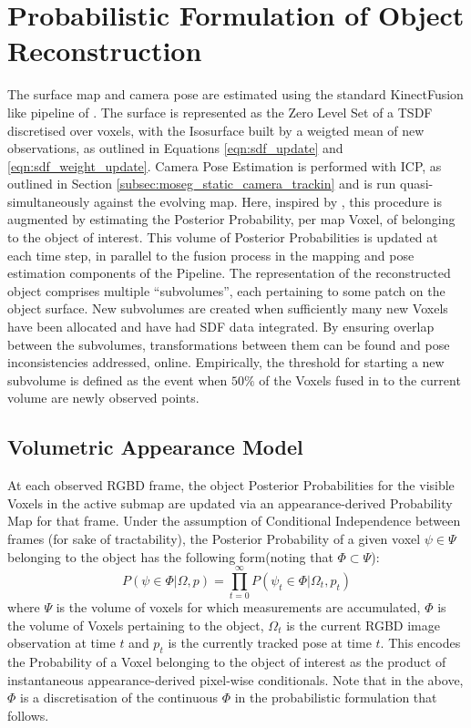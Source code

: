 \section{Probabilistic Formulation of Object Reconstruction}
\label{sec:probobj_prob_formulation}
The surface map and camera pose are estimated using the standard KinectFusion
like pipeline of \cite{Newcombe2011,Prisacariu2014}. The surface is represented
as the Zero Level Set of a TSDF discretised over voxels, with the Isosurface
built by a weigted mean of new observations, as outlined in Equations
\ref{eqn:sdf_update} and \ref{eqn:sdf_weight_update}. Camera Pose Estimation is
performed with ICP, as outlined in Section
\ref{subsec:moseg_static_camera_trackin} and is run quasi-simultaneously against
the evolving map. Here, inspired by \cite{Kolev2006}, this procedure is
augmented by estimating the Posterior Probability, per map Voxel, of belonging
to the object of interest. This volume of Posterior Probabilities is updated at
each time step, in parallel to the fusion process in the mapping and pose
estimation components of the Pipeline. The representation of the reconstructed
object comprises multiple ``subvolumes'', each pertaining to some patch on the
object surface. New subvolumes are created when sufficiently many new Voxels
have been allocated and have had SDF data integrated. By ensuring overlap
between the subvolumes, transformations between them can be found and pose
inconsistencies addressed, online. Empirically, the threshold for starting a new
subvolume is defined as the event when $50\%$ of the Voxels fused in to the
current volume are newly observed points.

\subsection{Volumetric Appearance Model}
\label{subsec:probobj_vol_appearance_model}
At each observed RGBD frame, the object Posterior Probabilities for the visible
Voxels in the active submap are updated via an appearance-derived Probability
Map for that frame. Under the assumption of Conditional Independence between
frames (for sake of tractability), the Posterior Probability of a given voxel
$\psi \in \Psi$ belonging to the object has the following form(noting that
$\Phi \subset \Psi$):
\begin{equation}
\label{eqn:probobj_voxel_posterior}
P(\psi \in \Phi | \Omega, p) = \prod_{t=0}^{\infty}
P(\psi_{t} \in \Phi | \Omega_{t}, p_{t})
\end{equation}
where $\Psi$ is the volume of voxels for which measurements are accumulated,
$\Phi$  is the volume of Voxels pertaining to the object, $\Omega_{t}$ is the
current RGBD image observation at time $t$ and $p_{t}$ is the currently tracked
pose at time $t$. This encodes the Probability of a Voxel belonging to the
object of interest as the product of instantaneous appearance-derived pixel-wise
conditionals. Note that in the above, $\Phi$ is a discretisation of the
continuous $\Phi$ in the probabilistic formulation that follows.

